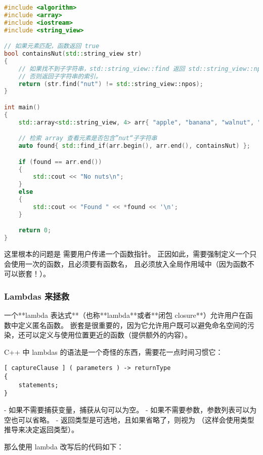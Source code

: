 \documentclass[../../LearnCpp.tex]{subfiles}
\begin{document}

\begin{lstlisting}[language=C++]
#include <algorithm>
#include <array>
#include <iostream>
#include <string_view>

// 如果元素匹配，函数返回 true
bool containsNut(std::string_view str)
{
    // 如果找不到子字符串，std::string_view::find 返回 std::string_view::npos，
    // 否则返回子字符串的索引。
    return (str.find("nut") != std::string_view::npos);
}

int main()
{
    std::array<std::string_view, 4> arr{ "apple", "banana", "walnut", "lemon" };

    // 检索 array 查看元素是否包含”nut“子字符串
    auto found{ std::find_if(arr.begin(), arr.end(), containsNut) };

    if (found == arr.end())
    {
        std::cout << "No nuts\n";
    }
    else
    {
        std::cout << "Found " << *found << '\n';
    }

    return 0;
}
\end{lstlisting}

这里根本的问题是  需要用户传递一个函数指针。
正因如此，需要强制定义一个只会使用一次的函数，且必须要有函数名，
且必须放入全局作用域中（因为函数不可以嵌套！）。

\subsubsection*{Lambdas 来拯救}

一个**lambda 表达式**（也称**lambda**或者**闭包 closure**）允许用户在函数中定义匿名函数。
嵌套是很重要的，因为它允许用户既可以避免命名空间的污染，还可以定义与使用位置更近的函数（提供额外的内容）。

C++ 中 lambdas 的语法是一个奇怪的东西，需要花一点时间习惯它：

\begin{lstlisting}
[ captureClause ] ( parameters ) -> returnType
{
    statements;
}
\end{lstlisting}

- 如果不需要捕获变量，捕获从句可以为空。
- 如果不需要参数，参数列表可以为空也可以省略。
- 返回类型是可选地，且如果省略了，则视为 （这样会使用类型推导来决定返回类型）。

那么使用 lambda 改写后的代码如下：
\end{document}
